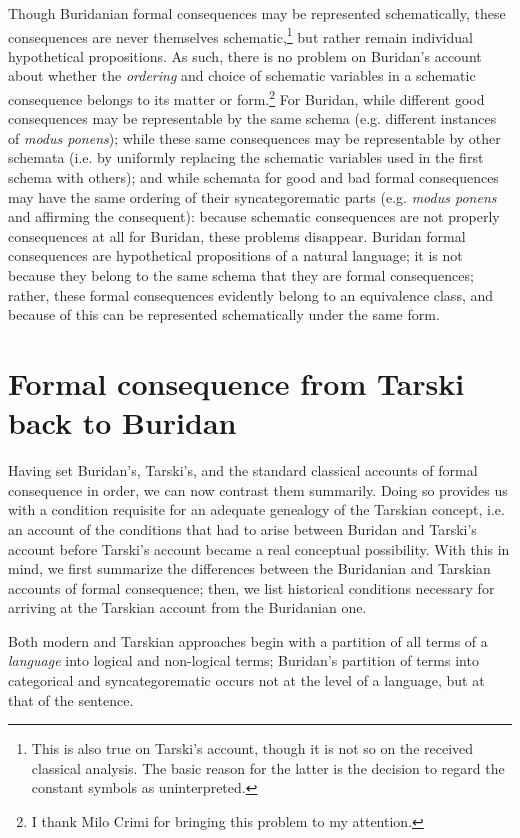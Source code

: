 \documentclass[]{article}
\begin{document}
Though Buridanian formal consequences may be represented schematically, these consequences are never themselves schematic,\footnote{This is also true on Tarski's account, though it is not so on the received classical analysis. The basic reason for the latter is the decision to regard the constant symbols as uninterpreted.} but rather remain individual hypothetical propositions. As such, there is no problem on Buridan's account about whether the \textit{ordering} and choice of schematic variables in a schematic consequence belongs to its matter or form.\footnote{I thank Milo Crimi for bringing this problem to my attention.} For Buridan, while different good consequences may be representable by the same schema (e.g. different instances of \textit{modus ponens}); while these same consequences may be representable by other schemata (i.e. by uniformly replacing the schematic variables used in the first schema with others); and while schemata for good and bad formal consequences may have the same ordering of their syncategorematic parts (e.g. \textit{modus ponens} and affirming the consequent): because schematic consequences are not properly consequences at all for Buridan, these problems disappear. Buridan formal consequences are hypothetical propositions of a natural language; it is not because they belong to the same schema that they are formal consequences; rather, these formal consequences evidently belong to an equivalence class, and because of this can be represented schematically under the same form.

\section{Formal consequence from Tarski back to Buridan}
Having set Buridan's, Tarski's, and the standard classical accounts of formal consequence in order, we can now contrast them summarily. Doing so provides us with a condition requisite for an adequate genealogy of the Tarskian concept, i.e. an account of the conditions that had to arise between Buridan and Tarski's account before Tarski's account became a real conceptual possibility. With this in mind, we first summarize the differences between the Buridanian and Tarskian accounts of formal consequence; then, we list historical conditions necessary for arriving at the Tarskian account from the Buridanian one.

Both modern and Tarskian approaches begin with a partition of all terms of a \textit{language} into logical and non-logical terms; Buridan's partition of terms into categorical and syncategorematic occurs not at the level of a language, but at that of the sentence. 
\end{document}
